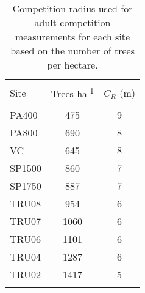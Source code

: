 
\begin{table}[!htbp] \centering 
  \caption{Competition radius used for adult competition measurements for each site based on the number of trees per hectare.} 
  \label{comp_radius} 
\begin{tabular}{@{\extracolsep{5pt}} lS[table-format=3.2]S[table-format=3.2]} 
\\[-1.8ex]\hline 
\hline \\[-1.8ex] 
{Site} & {Trees ha\textsuperscript{-1}} & {$C_R$ (m)} \\
\hline \\[-1.8ex] 
PA400 & 475 & 9 \\ 
PA800 & 690 & 8 \\ 
VC & 645 & 8 \\ 
SP1500 & 860 & 7 \\ 
SP1750 & 887 & 7 \\ 
TRU08 & 954 & 6 \\ 
TRU07 & 1060 & 6 \\ 
TRU06 & 1101 & 6 \\ 
TRU04 & 1287 & 6 \\ 
TRU02 & 1417 & 5 \\ 
\hline \\[-1.8ex] 
\end{tabular} 
\end{table} 
